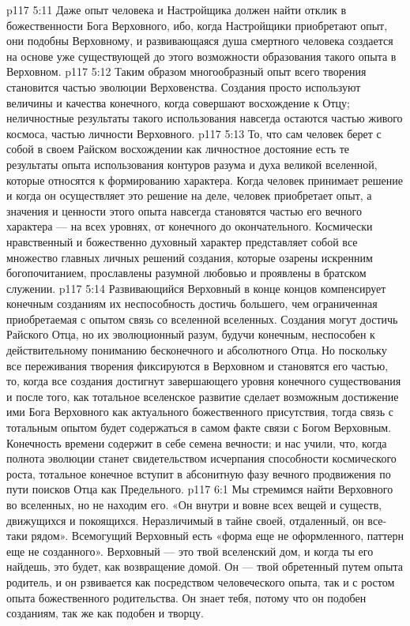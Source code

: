 \vs p117 5:11 Даже опыт человека и Настройщика должен найти отклик в божественности Бога Верховного, ибо, когда Настройщики приобретают опыт, они подобны Верховному, и развивающаяся душа смертного человека создается на основе уже существующей до этого возможности образования такого опыта в Верховном.
\vs p117 5:12 Таким образом многообразный опыт всего творения становится частью эволюции Верховенства. Создания просто используют величины и качества конечного, когда совершают восхождение к Отцу; неличностные результаты такого использования навсегда остаются частью живого космоса, частью личности Верховного.
\vs p117 5:13 То, что сам человек берет с собой в своем Райском восхождении как личностное достояние есть те результаты опыта использования контуров разума и духа великой вселенной, которые относятся к формированию характера. Когда человек принимает решение и когда он осуществляет это решение на деле, человек приобретает опыт, а значения и ценности этого опыта навсегда становятся частью его вечного характера --- на всех уровнях, от конечного до окончательного. Космически нравственный и божественно духовный характер представляет собой все множество главных личных решений создания, которые озарены искренним богопочитанием, прославлены разумной любовью и проявлены в братском служении.
\vs p117 5:14 Развивающийся Верховный в конце концов компенсирует конечным созданиям их неспособность достичь большего, чем ограниченная приобретаемая с опытом связь со вселенной вселенных. Создания могут достичь Райского Отца, но их эволюционный разум, будучи конечным, неспособен к действительному пониманию бесконечного и абсолютного Отца. Но поскольку все переживания творения фиксируются в Верховном и становятся его частью, то, когда все создания достигнут завершающего уровня конечного существования и после того, как тотальное вселенское развитие сделает возможным достижение ими Бога Верховного как актуального божественного присутствия, тогда связь с тотальным опытом будет содержаться в самом факте связи с Богом Верховным. Конечность времени содержит в себе семена вечности; и нас учили, что, когда полнота эволюции станет свидетельством исчерпания способности космического роста, тотальное конечное вступит в абсонитную фазу вечного продвижения по пути поисков Отца как Предельного.
\vs p117 6:1 Мы стремимся найти Верховного во вселенных, но не находим его. «Он внутри и вовне всех вещей и существ, движущихся и покоящихся. Неразличимый в тайне своей, отдаленный, он все\hyp{}таки рядом». Всемогущий Верховный есть «форма еще не оформленного, паттерн еще не созданного». Верховный --- это твой вселенский дом, и когда ты его найдешь, это будет, как возвращение домой. Он --- твой обретенный путем опыта родитель, и он рзвивается как посредством человеческого опыта, так и с ростом опыта божественного родительства. Он знает тебя, потому что он подобен созданиям, так же как подобен и творцу.
